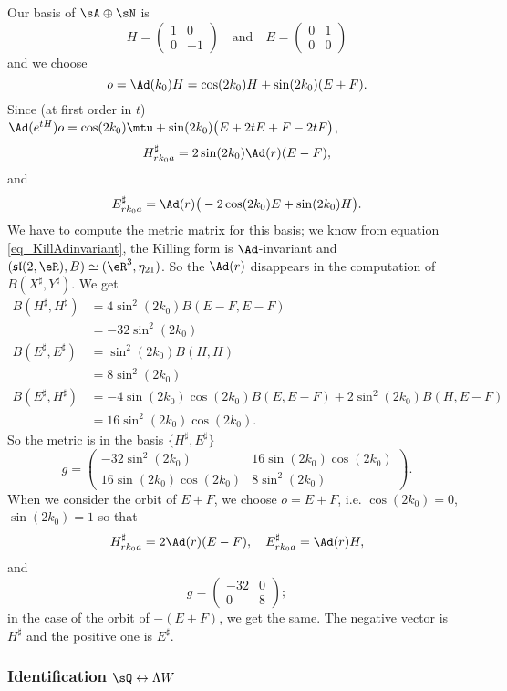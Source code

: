 Our basis of $\sA\oplus\sN$ is
\[
	H=\begin{pmatrix}
		1 & 0 \\0&-1
	\end{pmatrix}\quad\text{and}\quad
	E=\begin{pmatrix}
		0 & 1 \\0&0
	\end{pmatrix}
\]
and we choose
\[
	o=\Ad(k_0)H=\cos(2k_0)H+\sin(2k_0)(E+F).
\]
Since (at first order in $t$) $\Ad( e^{tH})o=\cos(2k_0)\mtu+\sin(2k_0)\big( E+2tE+F-2tF \big)$,
\[
	H^{\sharp}_{rk_0a}=2\sin(2k_0)\Ad(r)(E-F),
\]
and
\[
	E^{\sharp}_{rk_0a}=\Ad(r)\big( -2\cos(2k_0)E+\sin(2k_0)H \big).
\]
We have to compute the metric matrix for this basis; we know from equation \eqref{eq_KillAdinvariant}, the Killing form is $\Ad$-invariant and $(\mathfrak{sl}(2,\eR),B)\simeq(\eR^3,\eta_{21})$. So the $\Ad(r)$ disappears in the computation of $B(X^{\sharp},Y^{\sharp})$. We get
\[
	\begin{split}
		B(H^{\sharp},H^{\sharp})&=4\sin^2(2k_0)B(E-F,E-F)\\
		&=-32\sin^2(2k_0)\\
		B(E^{\sharp},E^{\sharp})&=\sin^2(2k_0)B(H,H)\\
		&=8\sin^2(2k_0)\\
		B(E^{\sharp},H^{\sharp})&=-4\sin(2k_0)\cos(2k_0)B(E,E-F)+2\sin^2(2k_0)B(H,E-F)\\
		&=16\sin^2(2k_0)\cos(2k_0).
	\end{split}
\]
So the metric is in the basis $\{ H^{\sharp},E^{\sharp} \}$
\begin{equation}
	g=
	\begin{pmatrix}
		-32\sin^2(2k_0)        & 16\sin(2k_0)\cos(2k_0) \\
		16\sin(2k_0)\cos(2k_0) & 8\sin^2(2k_0)
	\end{pmatrix}.
\end{equation}
When we consider the orbit of $E+F$, we choose $o=E+F$, i.e. $\cos(2k_0)=0$, $\sin(2k_0)=1$ so that
\begin{equation}
	H^{\sharp}_{rk_0a}=2\Ad(r)(E-F),\quad E^{\sharp}_{rk_0a}=\Ad(r)H,
\end{equation}
and
\[
	g=\begin{pmatrix}
		-32 & 0 \\0&8
	\end{pmatrix};
\]
in the case of the orbit of $-(E+F)$, we get the same. The negative vector is $H^{\sharp}$ and the positive one is $E^{\sharp}$.

\subsubsection{Identification \texorpdfstring{$\sQ\leftrightarrow\Lambda W$}{QW}}

